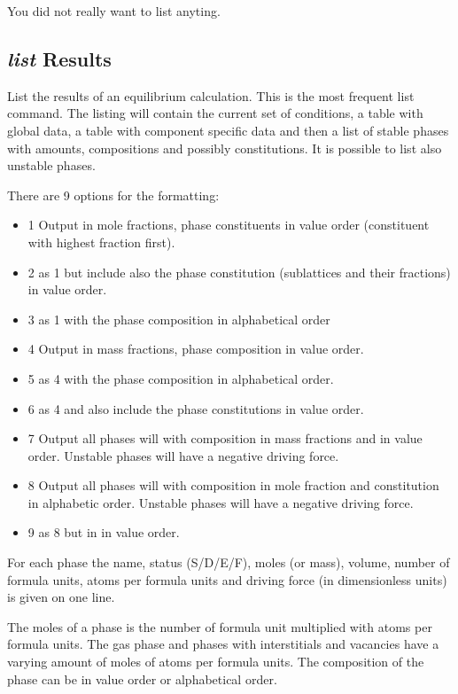 \documentclass[12pt]{article}
\begin{document}
You did not really want to list anyting.

\subsection{{\em list} Results}

List the results of an equilibrium calculation.  This is the most
frequent list command.  The listing will contain the current set of
conditions, a table with global data, a table with component specific
data and then a list of stable phases with amounts, compositions and
possibly constitutions.  It is possible to list also unstable phases.

There are 9 options for the formatting:
\begin{itemize}
\item 1 Output in mole fractions, phase constituents in value order
  (constituent with highest fraction first).
\item 2 as 1 but include also the phase constitution (sublattices and
  their fractions) in value order.
\item 3 as 1 with the phase composition in alphabetical order
\item 4 Output in mass fractions, phase composition in value order.
\item 5 as 4 with the phase composition in alphabetical order.
\item 6 as 4 and also include the phase constitutions in value order.
\item 7 Output all phases will with composition in mass fractions and
  in value order.  Unstable phases will have a negative driving force.
\item 8 Output all phases will with composition in mole fraction and
  constitution in alphabetic order.  Unstable phases will have a
  negative driving force.
\item 9 as 8 but in in value order.
\end{itemize}

For each phase the name, status (S/D/E/F), moles (or mass), volume,
number of formula units, atoms per formula units and driving force (in
dimensionless units) is given on one line.

The moles of a phase is the number of formula unit multiplied with
atoms per formula units.  The gas phase and phases with interstitials
and vacancies have a varying amount of moles of atoms per formula
units.  The composition of the phase can be in value order or
alphabetical order.
\end{document}
